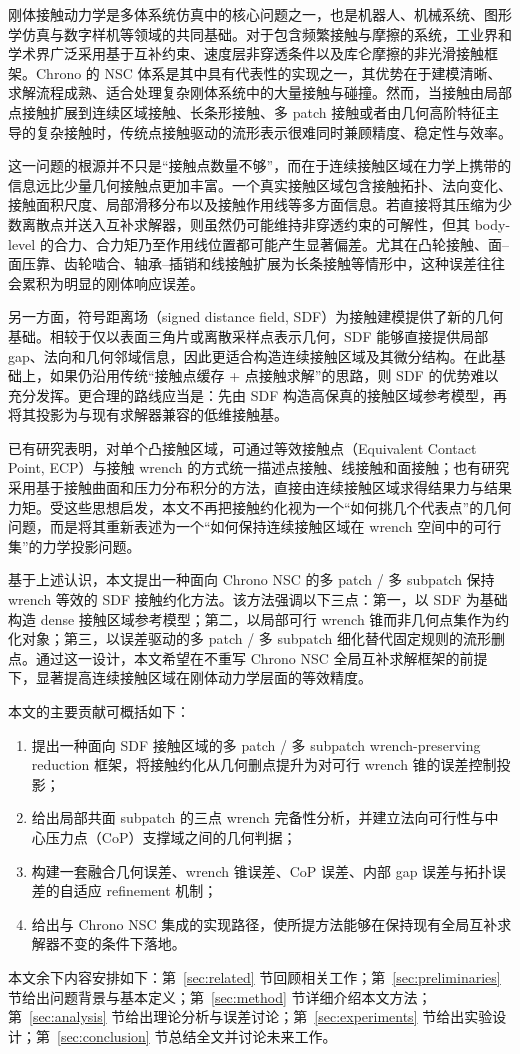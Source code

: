 刚体接触动力学是多体系统仿真中的核心问题之一，也是机器人、机械系统、图形学仿真与数字样机等领域的共同基础。对于包含频繁接触与摩擦的系统，工业界和学术界广泛采用基于互补约束、速度层非穿透条件以及库仑摩擦的非光滑接触框架。Chrono 的 NSC 体系是其中具有代表性的实现之一，其优势在于建模清晰、求解流程成熟、适合处理复杂刚体系统中的大量接触与碰撞。然而，当接触由局部点接触扩展到连续区域接触、长条形接触、多 patch 接触或者由几何高阶特征主导的复杂接触时，传统点接触驱动的流形表示很难同时兼顾精度、稳定性与效率。

这一问题的根源并不只是“接触点数量不够”，而在于连续接触区域在力学上携带的信息远比少量几何接触点更加丰富。一个真实接触区域包含接触拓扑、法向变化、接触面积尺度、局部滑移分布以及接触作用线等多方面信息。若直接将其压缩为少数离散点并送入互补求解器，则虽然仍可能维持非穿透约束的可解性，但其 body-level 的合力、合力矩乃至作用线位置都可能产生显著偏差。尤其在凸轮接触、面--面压靠、齿轮啮合、轴承--插销和线接触扩展为长条接触等情形中，这种误差往往会累积为明显的刚体响应误差。

另一方面，符号距离场（signed distance field, SDF）为接触建模提供了新的几何基础。相较于仅以表面三角片或离散采样点表示几何，SDF 能够直接提供局部 gap、法向和几何邻域信息，因此更适合构造连续接触区域及其微分结构。在此基础上，如果仍沿用传统“接触点缓存 + 点接触求解”的思路，则 SDF 的优势难以充分发挥。更合理的路线应当是：先由 SDF 构造高保真的接触区域参考模型，再将其投影为与现有求解器兼容的低维接触基。

已有研究表明，对单个凸接触区域，可通过等效接触点（Equivalent Contact Point, ECP）与接触 wrench 的方式统一描述点接触、线接触和面接触；也有研究采用基于接触曲面和压力分布积分的方法，直接由连续接触区域求得结果力与结果力矩。受这些思想启发，本文不再把接触约化视为一个“如何挑几个代表点”的几何问题，而是将其重新表述为一个“如何保持连续接触区域在 wrench 空间中的可行集”的力学投影问题。

基于上述认识，本文提出一种面向 Chrono NSC 的多 patch / 多 subpatch 保持 wrench 等效的 SDF 接触约化方法。该方法强调以下三点：第一，以 SDF 为基础构造 dense 接触区域参考模型；第二，以局部可行 wrench 锥而非几何点集作为约化对象；第三，以误差驱动的多 patch / 多 subpatch 细化替代固定规则的流形删点。通过这一设计，本文希望在不重写 Chrono NSC 全局互补求解框架的前提下，显著提高连续接触区域在刚体动力学层面的等效精度。

本文的主要贡献可概括如下：
\begin{enumerate}[label=(\arabic*)]
    \item 提出一种面向 SDF 接触区域的多 patch / 多 subpatch wrench-preserving reduction 框架，将接触约化从几何删点提升为对可行 wrench 锥的误差控制投影；
    \item 给出局部共面 subpatch 的三点 wrench 完备性分析，并建立法向可行性与中心压力点（CoP）支撑域之间的几何判据；
    \item 构建一套融合几何误差、wrench 锥误差、CoP 误差、内部 gap 误差与拓扑误差的自适应 refinement 机制；
    \item 给出与 Chrono NSC 集成的实现路径，使所提方法能够在保持现有全局互补求解器不变的条件下落地。
\end{enumerate}

本文余下内容安排如下：第~\ref{sec:related} 节回顾相关工作；第~\ref{sec:preliminaries} 节给出问题背景与基本定义；第~\ref{sec:method} 节详细介绍本文方法；第~\ref{sec:analysis} 节给出理论分析与误差讨论；第~\ref{sec:experiments} 节给出实验设计；第~\ref{sec:conclusion} 节总结全文并讨论未来工作。
